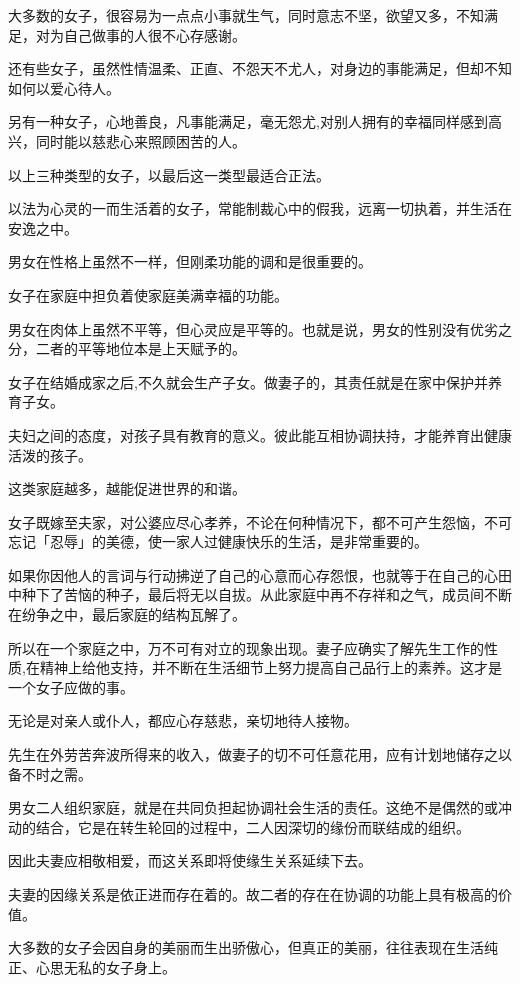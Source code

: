 \documentclass[twoside,openany]{book}
\begin{document}
大多数的女子，很容易为一点点小事就生气，同时意志不坚，欲望又多，不知满足，对为自己做事的人很不心存感谢。

还有些女子，虽然性情温柔、正直、不怨天不尤人，对身边的事能满足，但却不知如何以爱心待人。

另有一种女子，心地善良，凡事能满足，毫无怨尤,对别人拥有的幸福同样感到高兴，同时能以慈悲心来照顾困苦的人。

以上三种类型的女子，以最后这一类型最适合正法。

以法为心灵的一而生活着的女子，常能制裁心中的假我，远离一切执着，并生活在安逸之中。

男女在性格上虽然不一样，但刚柔功能的调和是很重要的。

女子在家庭中担负着使家庭美满幸福的功能。

男女在肉体上虽然不平等，但心灵应是平等的。也就是说，男女的性别没有优劣之分，二者的平等地位本是上天赋予的。

女子在结婚成家之后,不久就会生产子女。做妻子的，其责任就是在家中保护并养育子女。

夫妇之间的态度，对孩子具有教育的意义。彼此能互相协调扶持，才能养育出健康活泼的孩子。

这类家庭越多，越能促进世界的和谐。

女子既嫁至夫家，对公婆应尽心孝养，不论在何种情况下，都不可产生怨恼，不可忘记「忍辱」的美德，使一家人过健康快乐的生活，是非常重要的。

如果你因他人的言词与行动拂逆了自己的心意而心存怨恨，也就等于在自己的心田中种下了苦恼的种子，最后将无以自拔。从此家庭中再不存祥和之气，成员间不断在纷争之中，最后家庭的结构瓦解了。

所以在一个家庭之中，万不可有对立的现象出现。妻子应确实了解先生工作的性质,在精神上给他支持，并不断在生活细节上努力提高自己品行上的素养。这才是一个女子应做的事。

无论是对亲人或仆人，都应心存慈悲，亲切地待人接物。

先生在外劳苦奔波所得来的收入，做妻子的切不可任意花用，应有计划地储存之以备不时之需。

男女二人组织家庭，就是在共同负担起协调社会生活的责任。这绝不是偶然的或冲动的结合，它是在转生轮回的过程中，二人因深切的缘份而联结成的组织。

因此夫妻应相敬相爱，而这关系即将使缘生关系延续下去。

夫妻的因缘关系是依正进而存在着的。故二者的存在在协调的功能上具有极高的价值。

大多数的女子会因自身的美丽而生出骄傲心，但真正的美丽，往往表现在生活纯正、心思无私的女子身上。
\end{document}
